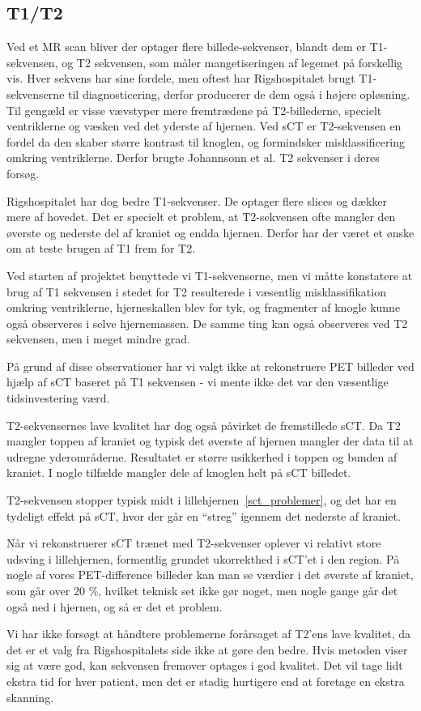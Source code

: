 \subsection{T1/T2}

Ved et MR scan bliver der optager flere billede-sekvenser, blandt dem er T1-sekvensen, og T2 sekvensen, som måler mangetiseringen af legemet på forskellig vis. Hver sekvens har sine fordele, men oftest har Rigshospitalet brugt T1-sekvenserne til diagnosticering, derfor producerer de dem også i højere opløsning. Til gengæld er visse vævstyper mere fremtrædene på T2-billederne, specielt ventriklerne og væsken ved det yderste af hjernen. Ved sCT er T2-sekvensen en fordel da den skaber større kontrast til knoglen, og formindsker misklassificering omkring ventriklerne. Derfor brugte Johannsonn et al. T2 sekvenser i deres forsøg.

Rigshospitalet har dog bedre T1-sekvenser. De optager flere slices og dækker mere af hovedet. Det er specielt et problem, at T2-sekvensen ofte mangler den øverste og nederste del af kraniet og endda hjernen. Derfor har der været et ønske om at teste brugen af T1 frem for T2.

Ved starten af projektet benyttede vi T1-sekvenserne, men vi måtte konstatere at brug af T1 sekvensen i stedet for T2 resulterede i væsentlig misklassifikation omkring ventriklerne, hjerneskallen blev for tyk, og fragmenter af knogle kunne også observeres i selve hjernemassen. De samme ting kan også observeres ved T2 sekvensen, men i meget mindre grad.

På grund af disse observationer har vi valgt ikke at rekonstruere PET billeder ved hjælp af sCT baseret på T1 sekvensen - vi mente ikke det var den væsentlige tidsinvestering værd.

T2-sekvensernes lave kvalitet har dog også påvirket de fremstillede sCT. Da T2 mangler toppen af kraniet og typisk det øverste af hjernen mangler der data til at udregne yderområderne. Resultatet er større usikkerhed i toppen og bunden af kraniet. I nogle tilfælde mangler dele af knoglen helt på sCT billedet. 

T2-sekvensen stopper typisk midt i lillehjernen~\ref{sct_problemer}, og det har en tydeligt effekt på sCT, hvor der går en “streg” igennem det nederste af kraniet. 

Når vi rekonstruerer sCT trænet med T2-sekvenser oplever vi relativt store udsving i lillehjernen, formentlig grundet ukorrekthed i sCT’et i den region. På nogle af vores PET-difference billeder kan man se værdier i det øverste af kraniet, som går over 20 \%, hvilket teknisk set ikke gør noget, men nogle gange går det også ned i hjernen, og så er det et problem.

Vi har ikke forsøgt at håndtere problemerne forårsaget af T2’ens lave kvalitet, da det er et valg fra Rigshospitalets side ikke at gøre den bedre. Hvis metoden viser sig at være god, kan sekvensen fremover optages i god kvalitet. Det vil tage lidt ekstra tid for hver patient, men det er stadig hurtigere end at foretage en ekstra skanning.

